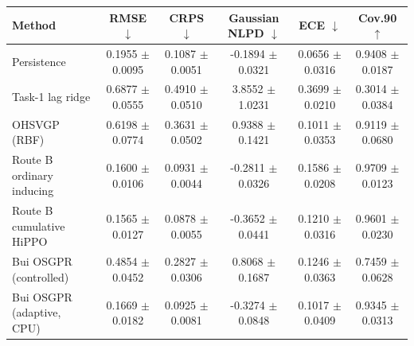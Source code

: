 \begin{tabular}{lccccc}
\toprule
Method & RMSE $\downarrow$ & CRPS $\downarrow$ & Gaussian NLPD $\downarrow$ & ECE $\downarrow$ & Cov.90 $\uparrow$ \\
\midrule
Persistence & 0.1955 $\pm$ 0.0095 & 0.1087 $\pm$ 0.0051 & -0.1894 $\pm$ 0.0321 & 0.0656 $\pm$ 0.0316 & 0.9408 $\pm$ 0.0187 \\
Task-1 lag ridge & 0.6877 $\pm$ 0.0555 & 0.4910 $\pm$ 0.0510 & 3.8552 $\pm$ 1.0231 & 0.3699 $\pm$ 0.0210 & 0.3014 $\pm$ 0.0384 \\
OHSVGP (RBF) & 0.6198 $\pm$ 0.0774 & 0.3631 $\pm$ 0.0502 & 0.9388 $\pm$ 0.1421 & 0.1011 $\pm$ 0.0353 & 0.9119 $\pm$ 0.0680 \\
Route B ordinary inducing & 0.1600 $\pm$ 0.0106 & 0.0931 $\pm$ 0.0044 & -0.2811 $\pm$ 0.0326 & 0.1586 $\pm$ 0.0208 & 0.9709 $\pm$ 0.0123 \\
Route B cumulative HiPPO & 0.1565 $\pm$ 0.0127 & 0.0878 $\pm$ 0.0055 & -0.3652 $\pm$ 0.0441 & 0.1210 $\pm$ 0.0316 & 0.9601 $\pm$ 0.0230 \\
Bui OSGPR (controlled) & 0.4854 $\pm$ 0.0452 & 0.2827 $\pm$ 0.0306 & 0.8068 $\pm$ 0.1687 & 0.1246 $\pm$ 0.0363 & 0.7459 $\pm$ 0.0628 \\
Bui OSGPR (adaptive, CPU) & 0.1669 $\pm$ 0.0182 & 0.0925 $\pm$ 0.0081 & -0.3274 $\pm$ 0.0848 & 0.1017 $\pm$ 0.0409 & 0.9345 $\pm$ 0.0313 \\
\bottomrule
\end{tabular}
